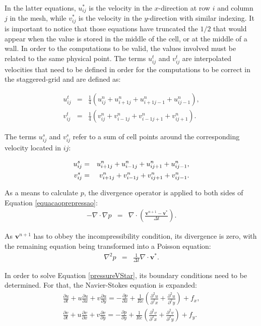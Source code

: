 \documentclass[journal]{IEEEtran}
\begin{document}
In the latter equations, $u^*_{ij}$ is the velocity in the $x$-direction at row $i$ and column $j$ in the mesh, while $v^*_{ij}$ is the velocity in the $y$-direction with similar indexing. It is important to notice that those equations have truncated the $1/2$ that would appear when the value is stored in the middle of the cell, or at the middle of a wall. In order to the computations to be valid, the values involved must be related to the same physical point. The terms $u_{ij}^t$ and $v_{ij}^t$ are interpolated velocities that need to be defined in order for the computations to be correct in the staggered-grid and are defined as:

\begin{eqnarray}
u_{ij}^t&=&\frac{1}{4}(u_{ij}^n+u_{i+1j}^n+u_{i+1j-1}^n+u_{ij-1}^n) \label{ut},\\ 
v_{ij}^t &=& \frac{1}{4}(v_{ij}^n+v_{i-1j}^n+v_{i-1j+1}^n+v_{ij+1}^n). \label{vt}
\end{eqnarray}


The terms $u^s_{ij}$ and $v^s_{ij}$ refer to a sum of cell points around the corresponding velocity located in $ij$:

\begin{eqnarray}
u_{ij}^s &=& \SumFour{u} \label{us}, \\
v_{ij}^s &=& \SumFour{v} \label{vs}.
\end{eqnarray}



As a means to calculate $p$, the divergence operator is applied to both sides of Equation \ref{equacaoprepressao}: \begin{eqnarray}
	-\nabla\cdot\nabla p & = &\nabla\cdot \left(\frac{\textbf{v}^{n+1}-\textbf{v}^*}{\Delta t}\right).
\end{eqnarray}

As $\mathbf{v}^{n+1}$ has to obbey the incompressibility condition, its divergence is zero, with the remaining equation being transformed into a Poisson equation: \begin{eqnarray}
\nabla^2 p & = & \frac{1}{\Delta t}\nabla\cdot \textbf{v}^{*}.	 \label{pressureVStar}
\end{eqnarray}



In order to solve Equation \ref{pressureVStar}, its boundary conditions need to be determined. For that, the Navier-Stokes equation is expanded: \begin{eqnarray}
\frac{\partial u}{\partial t}+u\frac{\partial u}{\partial x}+v\frac{\partial
u}{\partial y}=-\frac{\partial p}{\partial
x}+\frac{1}{\mathit{Re}}\left(\frac{\partial^2 u}{\partial^2 x}+\frac{\partial^2 u}{\partial^2
y}\right)+f_x, \label{navierX}\\
\frac{\partial v}{\partial t}+u\frac{\partial v}{\partial x}+v\frac{\partial
v}{\partial y}=-\frac{\partial p}{\partial
y}+\frac{1}{\mathit{Re}}\left(\frac{\partial^2 v}{\partial^2 x}+\frac{\partial^2 v}{\partial^2
y}\right)+f_y. \label{navierY}
\end{eqnarray}
\end{document}
